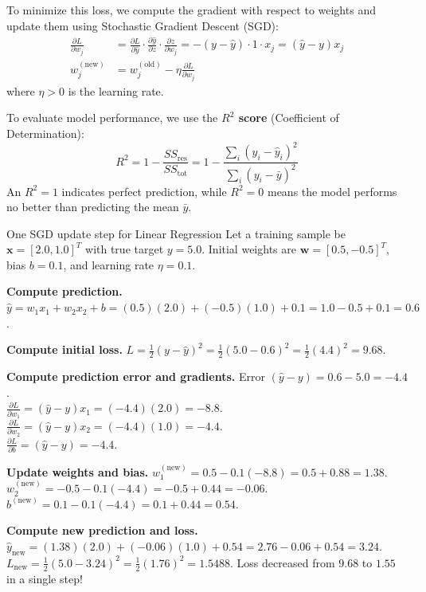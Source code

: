 \documentclass[a4paper,11pt]{article}
\newcommand{\vocab}[1]{\textbf{\color{navy}#1}}
\begin{document}
To minimize this loss, we compute the gradient with respect to weights and update them using Stochastic Gradient Descent (SGD):
\begin{align}
\frac{\partial L}{\partial w_j} &= \frac{\partial L}{\partial \hat{y}} \cdot \frac{\partial \hat{y}}{\partial z} \cdot \frac{\partial z}{\partial w_j} = - (y - \hat{y}) \cdot 1 \cdot x_j = (\hat{y} - y) x_j \\
w_j^{(\text{new})} &= w_j^{(\text{old})} - \eta \frac{\partial L}{\partial w_j}
\end{align}
where $\eta > 0$ is the learning rate.

To evaluate model performance, we use the \vocab{$R^2$ score} (Coefficient of Determination):
\begin{equation}
R^2 = 1 - \frac{SS_{\text{res}}}{SS_{\text{tot}}} = 1 - \frac{\sum_i (y_i - \hat{y}_i)^2}{\sum_i (y_i - \bar{y})^2}
\end{equation}
An $R^2 = 1$ indicates perfect prediction, while $R^2 = 0$ means the model performs no better than predicting the mean $\bar{y}$.

\begin{worked}{One SGD update step for Linear Regression}
Let a training sample be $\mathbf{x} = [2.0, 1.0]^T$ with true target $y = 5.0$. Initial weights are $\mathbf{w} = [0.5, -0.5]^T$, bias $b = 0.1$, and learning rate $\eta = 0.1$.
\begin{steps}
  \item \textbf{Compute prediction.}
        $\hat{y} = w_1 x_1 + w_2 x_2 + b = (0.5)(2.0) + (-0.5)(1.0) + 0.1 = 1.0 - 0.5 + 0.1 = 0.6$.
  \item \textbf{Compute initial loss.}
        $L = \frac{1}{2} (y - \hat{y})^2 = \frac{1}{2} (5.0 - 0.6)^2 = \frac{1}{2} (4.4)^2 = 9.68$.
  \item \textbf{Compute prediction error and gradients.}
        Error $(\hat{y} - y) = 0.6 - 5.0 = -4.4$. \\
        $\frac{\partial L}{\partial w_1} = (\hat{y} - y) x_1 = (-4.4)(2.0) = -8.8$. \\
        $\frac{\partial L}{\partial w_2} = (\hat{y} - y) x_2 = (-4.4)(1.0) = -4.4$. \\
        $\frac{\partial L}{\partial b} = (\hat{y} - y) = -4.4$.
  \item \textbf{Update weights and bias.}
        $w_1^{(\text{new})} = 0.5 - 0.1(-8.8) = 0.5 + 0.88 = 1.38$. \\
        $w_2^{(\text{new})} = -0.5 - 0.1(-4.4) = -0.5 + 0.44 = -0.06$. \\
        $b^{(\text{new})} = 0.1 - 0.1(-4.4) = 0.1 + 0.44 = 0.54$.
  \item \textbf{Compute new prediction and loss.}
        $\hat{y}_{\text{new}} = (1.38)(2.0) + (-0.06)(1.0) + 0.54 = 2.76 - 0.06 + 0.54 = 3.24$. \\
        $L_{\text{new}} = \frac{1}{2} (5.0 - 3.24)^2 = \frac{1}{2} (1.76)^2 = 1.5488$.
        Loss decreased from $9.68$ to $1.55$ in a single step!
\end{steps}
\end{worked}
\end{document}
